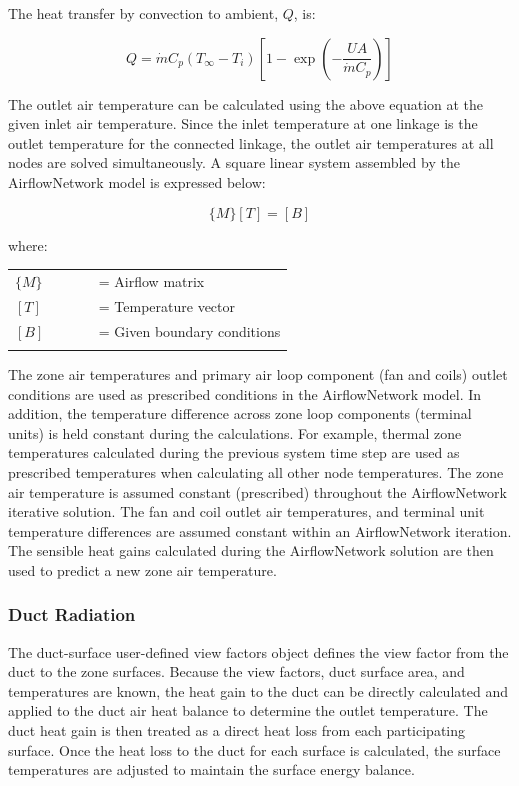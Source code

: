 The heat transfer by convection to ambient, $Q$, is:

\begin{equation}
Q = \dot{m} {C_p}(T_\infty- T_i)\left[1 - \exp \left( - \frac{UA}{\dot{m} C_p} \right) \right]
\end{equation}

The outlet air temperature can be calculated using the above equation at the given inlet air temperature. Since the inlet temperature at one linkage is the outlet temperature for the connected linkage, the outlet air temperatures at all nodes are solved simultaneously. A square linear system assembled by the AirflowNetwork model is expressed below:

\begin{equation}
\{ M\} [T] = [B]
\end{equation}

where:

\begin{tabular}{lp{0.7\linewidth}}
\\
$\{M\}$ &= Airflow matrix\\
$[T]$ &= Temperature vector\\
$[B]$ &= Given boundary conditions\\
\\
\end{tabular}

The zone air temperatures and primary air loop component (fan and coils) outlet conditions are used as prescribed conditions in the AirflowNetwork model. In addition, the temperature difference across zone loop components (terminal units) is held constant during the calculations. For example, thermal zone temperatures calculated during the previous system time step are used as prescribed temperatures when calculating all other node temperatures. The zone air temperature is assumed constant (prescribed) throughout the AirflowNetwork iterative solution. The fan and coil outlet air temperatures, and terminal unit temperature differences are assumed constant within an AirflowNetwork iteration. The sensible heat gains calculated during the AirflowNetwork solution are then used to predict a new zone air temperature.

\subsubsection{Duct Radiation}

The duct-surface user-defined view factors object defines the view factor from the duct to the zone surfaces. Because the view factors, duct surface area, and temperatures are known, the heat gain to the duct can be directly calculated and applied to the duct air heat balance to determine the outlet temperature. The duct heat gain is then treated as a direct heat loss from each participating surface. Once the heat loss to the duct for each surface is calculated, the surface temperatures are adjusted to maintain the surface energy balance.

